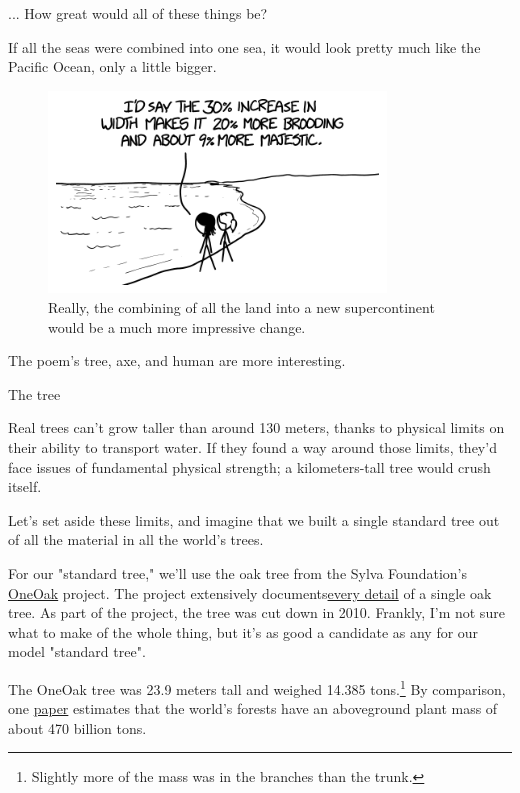 {{... How great would all of these things be?}

\hfill{}

{If all the seas were combined into one sea, it would look pretty much like the Pacific Ocean, only a little bigger.}

\begin{figure}[!htbp]
\centering
\includegraphics[scale=0.5, max width=0.8\textwidth]{imgs/a/90/ygg_pacific.png}
\caption{Really, the combining of all the land into a new supercontinent would be a much more impressive change.}
\end{figure}

{The poem's tree, axe, and human are more interesting.}

{The tree}

{Real trees can't grow taller than around 130 meters, thanks to physical limits on their ability to transport water. If they found a way around those limits, they'd face issues of fundamental physical strength; a kilometers-tall tree would crush itself.}

{Let's set aside these limits, and imagine that we built a single standard tree out of all the material in all the world's trees.}

{For our "standard tree," we'll use the oak tree from the Sylva Foundation's \href{http://sylva.org.uk/oneoak/index.php}{OneOak} project. The project extensively documents\href{http://sylva.org.uk/oneoak/tree\_facts.php}{every detail} of a single oak tree. As part of the project, the tree was cut down in 2010. Frankly, I'm not sure what to make of the whole thing, but it's as good a candidate as any for our model "standard tree".}

{The OneOak tree was 23.9 meters tall and weighed 14.385 tons.{\footnote{Slightly more of the mass was in the branches than the trunk.} } By comparison, one \href{http://www.silvafennica.fi/pdf/article244.pdf}{paper} estimates that the world's forests have an aboveground plant mass of about 470 billion tons.}

}
